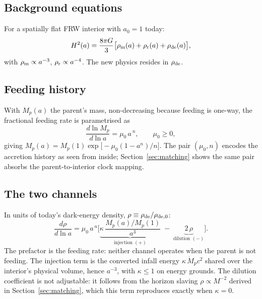 \documentclass[11pt,a4paper]{article}
\begin{document}
\subsection{Background equations}\label{sec:background}

For a spatially flat FRW interior with $a_0=1$ today:
\begin{equation}
H^2(a)=\frac{8\pi G}{3}\big[\rho_{\rm m}(a)+\rho_{\rm r}(a)+\rho_{\rm de}(a)\big],
\label{eq:friedmann}
\end{equation}
with $\rho_{\rm m}\propto a^{-3}$, $\rho_{\rm r}\propto a^{-4}$. The new physics resides in $\rho_{\rm de}$.

\subsection{Feeding history}\label{sec:feeding}

With $M_p(a)$ the parent's mass, non-decreasing because feeding is one-way, the fractional feeding rate is parametrised as
\begin{equation}
\frac{d\ln M_p}{d\ln a}=\mu_0\,a^{\,n},\qquad \mu_0\ge 0,
\label{eq:feeding}
\end{equation}
giving $M_p(a)=M_p(1)\exp\!\big[-\mu_0(1-a^{n})/n\big]$. The pair $(\mu_0,n)$ encodes the accretion history as seen from inside; Section~\ref{sec:matching} shows the same pair absorbs the parent-to-interior clock mapping.

\subsection{The two channels}\label{sec:channels}

In units of today's dark-energy density, $\rho\equiv\rho_{\rm de}/\rho_{\rm de,0}$:
\begin{equation}
\boxed{\ \frac{d\rho}{d\ln a}=\mu_0\,a^{\,n}\Big[\underbrace{\kappa\,\frac{M_p(a)/M_p(1)}{a^{3}}}_{\text{injection }(+)}\;-\;\underbrace{2\,\rho}_{\text{dilution }(-)}\Big].\ }
\label{eq:master}
\end{equation}
The prefactor is the feeding rate: neither channel operates when the parent is not feeding. The injection term is the converted infall energy $\kappa\,\dot M_p c^2$ shared over the interior's physical volume, hence $a^{-3}$, with $\kappa\le1$ on energy grounds. The dilution coefficient is not adjustable: it follows from the horizon slaving $\rho\propto M^{-2}$ derived in Section~\ref{sec:matching}, which this term reproduces exactly when $\kappa=0$.
\end{document}
